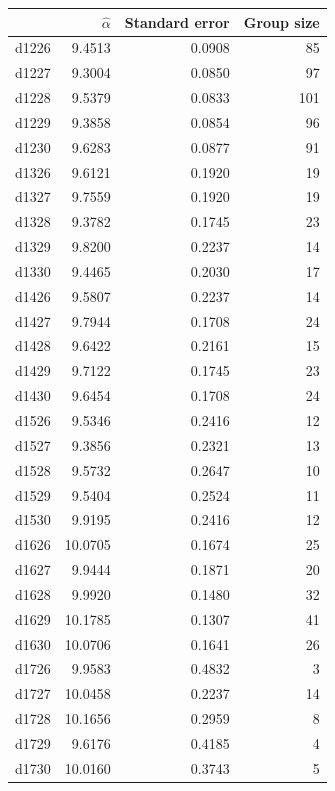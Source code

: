 \begin{tabular}{lrrr}
\toprule
 & $\widehat{\alpha}$ & Standard error & Group size \\
\midrule
d1226 & 9.4513 & 0.0908 & 85 \\
d1227 & 9.3004 & 0.0850 & 97 \\
d1228 & 9.5379 & 0.0833 & 101 \\
d1229 & 9.3858 & 0.0854 & 96 \\
d1230 & 9.6283 & 0.0877 & 91 \\
d1326 & 9.6121 & 0.1920 & 19 \\
d1327 & 9.7559 & 0.1920 & 19 \\
d1328 & 9.3782 & 0.1745 & 23 \\
d1329 & 9.8200 & 0.2237 & 14 \\
d1330 & 9.4465 & 0.2030 & 17 \\
d1426 & 9.5807 & 0.2237 & 14 \\
d1427 & 9.7944 & 0.1708 & 24 \\
d1428 & 9.6422 & 0.2161 & 15 \\
d1429 & 9.7122 & 0.1745 & 23 \\
d1430 & 9.6454 & 0.1708 & 24 \\
d1526 & 9.5346 & 0.2416 & 12 \\
d1527 & 9.3856 & 0.2321 & 13 \\
d1528 & 9.5732 & 0.2647 & 10 \\
d1529 & 9.5404 & 0.2524 & 11 \\
d1530 & 9.9195 & 0.2416 & 12 \\
d1626 & 10.0705 & 0.1674 & 25 \\
d1627 & 9.9444 & 0.1871 & 20 \\
d1628 & 9.9920 & 0.1480 & 32 \\
d1629 & 10.1785 & 0.1307 & 41 \\
d1630 & 10.0706 & 0.1641 & 26 \\
d1726 & 9.9583 & 0.4832 & 3 \\
d1727 & 10.0458 & 0.2237 & 14 \\
d1728 & 10.1656 & 0.2959 & 8 \\
d1729 & 9.6176 & 0.4185 & 4 \\
d1730 & 10.0160 & 0.3743 & 5 \\
\bottomrule
\end{tabular}
